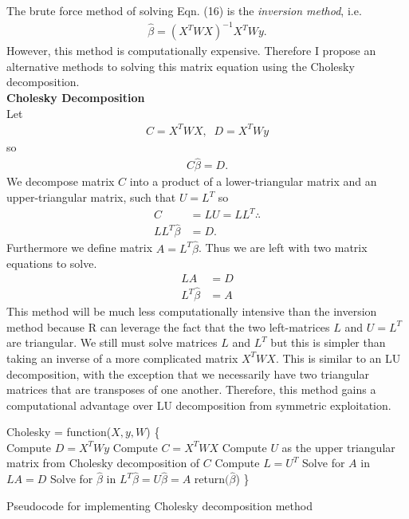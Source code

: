 \documentclass{article}
\begin{document}
\begin{enumerate}[label=(\Alph*)]
\bigskip
{\color{blue}
The brute force method of solving Eqn. (16) is the \emph{inversion method}, i.e.
		\begin{align}
			\hat{\beta} = (X^TWX)^{-1}X^TWy.
		\end{align} 
		However, this method is computationally expensive. Therefore I propose an alternative methods to solving this matrix equation using the Cholesky decomposition.\\
			\textbf{Cholesky Decomposition} \\
			Let 
			\begin{align}
				C = X^TWX, \;\;D=X^TWy
			\end{align}
			so 
			\begin{align}
				C\hat{\beta} = D.
			\end{align}
			We decompose matrix $C$ into a product of a lower-triangular matrix and an upper-triangular matrix, such that $U=L^T$ so
			\begin{align}
				C &= LU = LL^T \therefore \\
				LL^T\hat{\beta} &= D.
			\end{align}
			Furthermore we define matrix $A = L^T\hat{\beta}$. Thus we are left with two matrix equations to solve. 
			\begin{align}
				LA &= D \\
				L^T\hat{\beta} &= A
			\end{align}
			This method will be much less computationally intensive than the inversion method because R can leverage the fact that the two left-matrices $L$ and $U=L^T$ are triangular. We still must solve matrices $L$ and $L^T$ but this is simpler than taking an inverse of a more complicated matrix $X^TWX$. This is similar to an LU decomposition, with the exception that we necessarily have two triangular matrices that are transposes of one another. Therefore, this method gains a computational advantage over LU decomposition from symmetric exploitation.
			\begin{algorithm}[htp!]
			 Cholesky = function($X,y,W$) \{ \\
			 \vspace{2mm}
			 Compute $D = X^T W y$ \; 
			 Compute $C = X^T W X$\; 
			 \vspace{2mm}
			 Compute $U$ as the upper triangular matrix from Cholesky decomposition of $C$\;
			 Compute $L = U^T$\; 
			 \vspace{2mm}
			 Solve for $A$ in $LA=D$\;
			 Solve for $\hat{\beta}$ in $L^T\hat{\beta}=U\hat{\beta}=A$\;
			 \vspace{2mm}
			 return$(\hat{\beta}$)\; 
			 \}
			 \caption{Pseudocode for implementing Cholesky decomposition method}
			\end{algorithm}


}
\end{enumerate}
\end{document}
